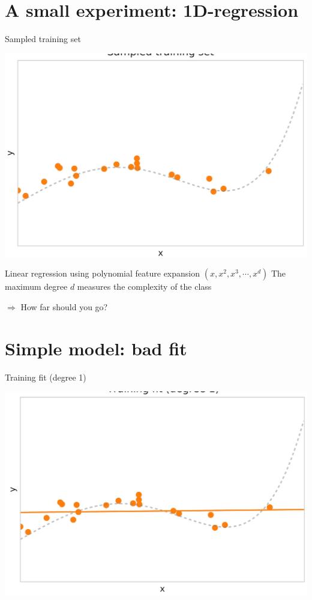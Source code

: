 \documentclass[10pt]{article}
\begin{document}
\section*{A small experiment: 1D-regression}
Sampled training set

\begin{center}
\includegraphics[max width=\textwidth]{2023_12_30_442f876157646883c2c9g-05}
\end{center}

Linear regression using polynomial feature expansion $\left(x, x^{2}, x^{3}, \cdots, x^{d}\right)$ The maximum degree $d$ measures the complexity of the class

$\Rightarrow$ How far should you go?

\section*{Simple model: bad fit}
Training fit (degree 1)

\begin{center}
\includegraphics[max width=\textwidth]{2023_12_30_442f876157646883c2c9g-06}
\end{center}
\end{document}
